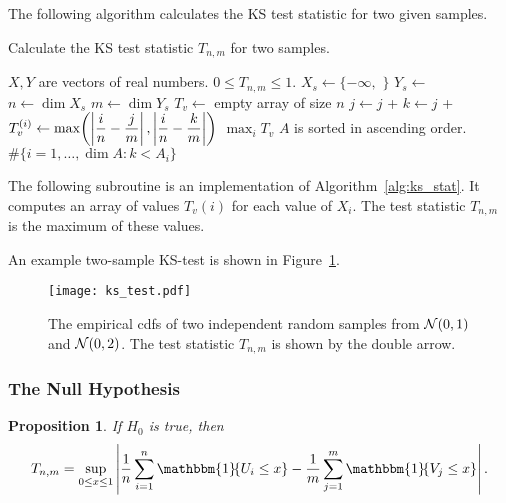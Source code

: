 \documentclass[letterpaper, reqno]{amsart}
\newtheorem{prop}{Proposition}[section]
\numberwithin{equation}{section}
\newcommand{\N}[2]{\mathcal{N}\mleft( #1, #2 \mright)}
\newcommand{\indic}[1]{\mathbbm{1}\!\mleft\{#1\mright\}} %
\newcommand{\sumi}[2]{\sum_{#1=1}^{#2}}
\newcommand{\avg}[2]{\frac{1}{#2}\sumi{#1}{#2}}
\begin{document}
\clearpage
The following algorithm calculates the KS test statistic for two given samples.
\begin{algorithm}[H]
  \caption{Calculate the KS test statistic $T_{n,m}$ for two samples.}
  \label{alg:ks_stat}
  \begin{algorithmic}[1]
    \Require $X, Y$ are vectors of real numbers.
    \Ensure $0 \le T_{n,m} \le 1$.
    \State $X_s \gets \{-\infty,$ $\}$
    \State $Y_s \gets$ 
    \State $n \gets \dim X_s$
    \State $m \gets \dim Y_s$
    \State $T_v \gets$ empty array of size $n$
      \State $j \gets j$ + 
      \State $k \gets j$ + 
      \State $\displaystyle{T_v^{(i)} \gets 
        \max\mleft(\left|\frac{i}{n} - \frac{j}{m}\right|,
              \left|\frac{i}{n} - \frac{k}{m}\right|\mright)}$
    \EndFor
    \State\Return $\max_i T_v$
    \EndProcedure
       $A$ is sorted in ascending order.
      \State\Return $\#\{i=1,\dots,\dim A \colon k < A_i\}$
    \EndFunction
  \end{algorithmic}
\end{algorithm}

\clearpage
The following subroutine is an implementation of Algorithm~\ref{alg:ks_stat}. It
computes an array of values $T_v(i)$ for each value of $X_i$. The test statistic
$T_{n,m}$ is the maximum of these values.


\clearpage
An example two-sample KS-test is shown in Figure~\ref{fig:ks_test}.
\begin{figure}[!h]
  \centering
  \texttt{[image: ks\_test.pdf]}
  \caption{The empirical cdfs of two independent random samples from $\N{0}{1}$ and $\N{0}{2}$. The test statistic $T_{n,m}$ is shown by the double arrow.}
  \label{fig:ks_test}
\end{figure}

\subsubsection{The Null Hypothesis}
\begin{prop}
  If $H_0$ is true, then
  \[ T_{n,m} = \sup_{0 \le x \le 1} \left| \avg{i}{n} \indic{U_i \le x}
- \avg{j}{m} \indic{V_j \le x} \right|. \]
\end{prop}
\end{document}
